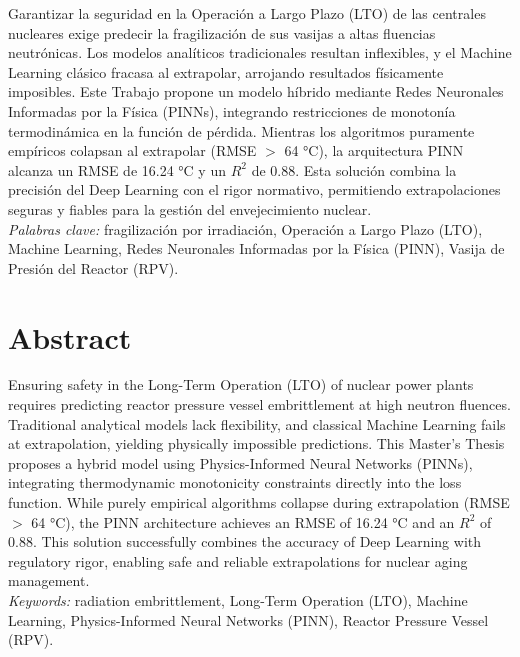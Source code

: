 \documentclass[a4paper, 12pt, twocolumn]{book}
\begin{document}
Garantizar la seguridad en la Operación a Largo Plazo (LTO) de las centrales nucleares exige predecir la fragilización de sus vasijas a altas fluencias neutrónicas. Los modelos analíticos tradicionales resultan inflexibles, y el Machine Learning clásico fracasa al extrapolar, arrojando resultados físicamente imposibles. Este Trabajo propone un modelo híbrido mediante Redes Neuronales Informadas por la Física (PINNs), integrando restricciones de monotonía termodinámica en la función de pérdida. Mientras los algoritmos puramente empíricos colapsan al extrapolar (RMSE $>$ 64 °C), la arquitectura PINN alcanza un RMSE de 16.24 °C y un $R^2$ de 0.88. Esta solución combina la precisión del Deep Learning con el rigor normativo, permitiendo extrapolaciones seguras y fiables para la gestión del envejecimiento nuclear.\\

\textit{Palabras clave:} fragilización por irradiación, Operación a Largo Plazo (LTO), Machine Learning, Redes Neuronales Informadas por la Física (PINN), Vasija de Presión del Reactor (RPV).

\section*{Abstract}

Ensuring safety in the Long-Term Operation (LTO) of nuclear power plants requires predicting reactor pressure vessel embrittlement at high neutron fluences. Traditional analytical models lack flexibility, and classical Machine Learning fails at extrapolation, yielding physically impossible predictions. This Master's Thesis proposes a hybrid model using Physics-Informed Neural Networks (PINNs), integrating thermodynamic monotonicity constraints directly into the loss function. While purely empirical algorithms collapse during extrapolation (RMSE $>$ 64 °C), the PINN architecture achieves an RMSE of 16.24 °C and an $R^2$ of 0.88. This solution successfully combines the accuracy of Deep Learning with regulatory rigor, enabling safe and reliable extrapolations for nuclear aging management.\\

\textit{Keywords:} radiation embrittlement, Long-Term Operation (LTO), Machine Learning, Physics-Informed Neural Networks (PINN), Reactor Pressure Vessel (RPV).

\newpage
\twocolumn

\tableofcontents
\end{document}
